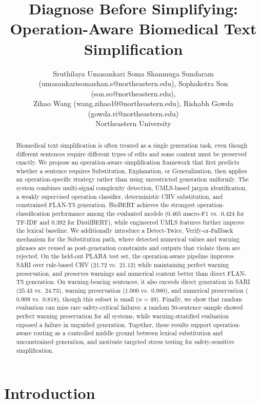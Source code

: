 \documentclass[11pt]{article}
\title{Diagnose Before Simplifying: Operation-Aware Biomedical Text Simplification}
\author{
  Sruthilaya Umasankari Soma Shanmuga Sundaram (umasankarisomashan.s@northeastern.edu), Sophakotra Son (son.so@northeastern.edu), \\
  Zihao Wang (wang.zihao10@northeastern.edu), Rishabh Gowda (gowda.ri@northeastern.edu) \\
  Northeastern University
}
\begin{document}
\maketitle
\pagestyle{plain}

\begin{abstract}
Biomedical text simplification is often treated as a single generation task,
even though different sentences require different types of edits and some
content must be preserved exactly. We propose an operation-aware
simplification framework that first predicts whether a sentence requires
Substitution, Explanation, or Generalization, then applies an
operation-specific strategy rather than using unrestricted generation
uniformly. The system combines multi-signal complexity detection,
UMLS-based jargon identification, a weakly supervised operation classifier,
deterministic CHV substitution, and constrained FLAN-T5 generation. BioBERT
achieves the strongest operation-classification performance among the
evaluated models ($0.465$ macro-F1 vs.\ $0.424$ for TF-IDF and $0.392$ for
DistilBERT), while engineered UMLS features further improve the lexical
baseline. We additionally introduce a Detect-Twice, Verify-or-Fallback
mechanism for the Substitution path, where detected numerical values and
warning phrases are reused as post-generation constraints and outputs that
violate them are rejected. On the held-out PLABA test set, the
operation-aware pipeline improves SARI over rule-based CHV ($21.72$ vs.\
$21.12$) while maintaining perfect warning preservation, and preserves
warnings and numerical content better than direct FLAN-T5 generation. On
warning-bearing sentences, it also exceeds direct generation in SARI
($25.43$ vs.\ $24.73$), warning preservation ($1.000$ vs.\ $0.980$), and
numerical preservation ($0.909$ vs.\ $0.818$), though this subset is small
($n=49$). Finally, we show that random evaluation can miss rare
safety-critical failures: a random 50-sentence sample showed perfect warning
preservation for all systems, while warning-stratified evaluation exposed a
failure in unguided generation. Together, these results support
operation-aware routing as a controlled middle ground between lexical
substitution and unconstrained generation, and motivate targeted stress
testing for safety-sensitive simplification.
\end{abstract}

\section{Introduction}
\end{document}
